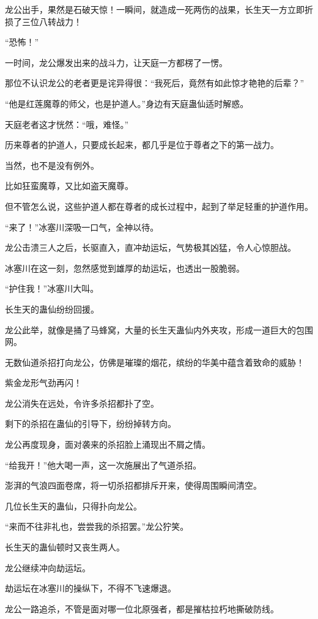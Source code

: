 \begin{this_body}
龙公出手，果然是石破天惊！一瞬间，就造成一死两伤的战果，长生天一方立即折损了三位八转战力！

“恐怖！”

一时间，龙公爆发出来的战斗力，让天庭一方都楞了一愣。

那位不认识龙公的老者更是诧异得很：“我死后，竟然有如此惊才艳艳的后辈？”

“他是红莲魔尊的师父，也是护道人。”身边有天庭蛊仙适时解惑。

天庭老者这才恍然：“哦，难怪。”

历来尊者的护道人，只要成长起来，都几乎是位于尊者之下的第一战力。

当然，也不是没有例外。

比如狂蛮魔尊，又比如盗天魔尊。

但不管怎么说，这些护道人都在尊者的成长过程中，起到了举足轻重的护道作用。

“来了！”冰塞川深吸一口气，全神以待。

龙公击溃三人之后，长驱直入，直冲劫运坛，气势极其凶猛，令人心惊胆战。

冰塞川在这一刻，忽然感觉到雄厚的劫运坛，也透出一股脆弱。

“护住我！”冰塞川大叫。

长生天的蛊仙纷纷回援。

龙公此举，就像是捅了马蜂窝，大量的长生天蛊仙内外夹攻，形成一道巨大的包围网。

无数仙道杀招打向龙公，仿佛是璀璨的烟花，缤纷的华美中蕴含着致命的威胁！

紫金龙形气劲再闪！

龙公消失在远处，令许多杀招都扑了空。

剩下的杀招在蛊仙的引导下，纷纷掉转方向。

龙公再度现身，面对袭来的杀招脸上涌现出不屑之情。

“给我开！”他大喝一声，这一次施展出了气道杀招。

澎湃的气浪四面卷席，将一切杀招都排斥开来，使得周围瞬间清空。

几位长生天的蛊仙，只得扑向龙公。

“来而不往非礼也，尝尝我的杀招罢。”龙公狞笑。

长生天的蛊仙顿时又丧生两人。

龙公继续冲向劫运坛。

劫运坛在冰塞川的操纵下，不得不飞速爆退。

龙公一路追杀，不管是面对哪一位北原强者，都是摧枯拉朽地撕破防线。


\end{this_body}
